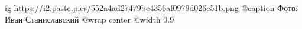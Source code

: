  
 
 
 
 

\ifcmt
  ig https://i2.paste.pics/552a4ad27479be4356af0979d026c51b.png
	@caption Фото: Иван Станиславский
  @wrap center
  @width 0.9
\fi
